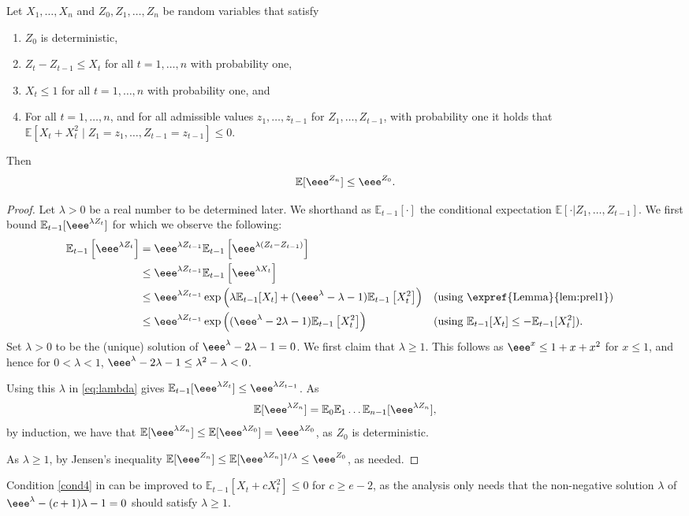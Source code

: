 \documentclass{toc}
\newcommand\E{\mathbb{E}}
\begin{document}
\begin{lemma}
\label{lem:prel2}
Let $X_1,\ldots,X_n$ and $Z_0,Z_1,\ldots,Z_n$ be random variables that satisfy
\begin{enumerate}
\item $Z_0$ is deterministic,
\item $Z_{t}-Z_{t-1}\le X_t$ for all $t=1,\ldots,n$ with probability one,
\item $X_t\leq 1$ for all $t=1,\ldots,n$ with probability one, and
\item \label{cond4} For all $t=1,\ldots,n$, and for all admissible values $z_1,\ldots,z_{t-1}$ for $Z_1,\ldots,Z_{t-1}$,
 with probability one it holds that $\E[X_t+X_t^2\mid Z_1=z_1,\ldots,Z_{t-1}=z_{t-1}] \le 0$.
\end{enumerate}
Then
\[
\E[\eee^{Z_n}] \leq \eee^{ Z_0}.
\]
\end{lemma}
\begin{proof}
Let $\lambda>0$ be a real number to be determined later. We shorthand as $\E_{t-1}[\cdot]$ the conditional expectation $\E[\cdot | Z_1,\dots, Z_{t-1}]$.
We first bound $\E_{t-1}[\eee^{\lambda Z_t}]$ for which we observe the following:
\begin{align}
\E_{t-1}\left[\eee^{\lambda Z_t}\right] &=  \eee^{\lambda Z_{t-1}}\E_{t-1}\left[\eee^{\lambda(Z_t-Z_{t-1})}\right] \nonumber \\
&\le  \eee^{\lambda Z_{t-1}}\E_{t-1}\left[\eee^{\lambda X_t}\right] \nonumber \\
& \le   \eee^{\lambda Z_{t-1}} \exp\left(\lambda \E_{t-1}[X_t] +(\eee^{ \lambda} -\lambda-1 )\E_{t-1}\left[X_t^2\right]\right) && \textrm{(using \expref{Lemma}{lem:prel1})}  \nonumber \\
& \le  \eee^{\lambda Z_{t-1}}\exp\left((\eee^{ \lambda} -2\lambda-1 )\E_{t-1}\left[X_t^2\right]\right) && \textrm{(using }\E_{t-1}[X_t] \le -\E_{t-1}[X_{t}^2] ).
\label{eq:lambda}
\end{align}
Set $\lambda>0$ to be the (unique) solution of $\eee^{ \lambda} -2\lambda-1 =0$.
We first claim that $ \lambda \geq 1$. This follows as  $\eee^x \leq 1 + x + x^2$ for $x \leq 1$, and hence for $0<\lambda<1$,
$\eee^{\lambda} -2\lambda-1 \le\lambda^2 -\lambda <0$.

Using this $\lambda$ in \eqref{eq:lambda} gives
 $\E_{t-1}[\eee^{\lambda Z_t}] \le \eee^{\lambda Z_{t-1}}$.
As
\[ \E[\eee^{\lambda Z_n}] = \E_0 \E_1 \ldots  \E_{n-1} [\eee^{\lambda Z_n}],\]
by induction, we have that $\E[\eee^{\lambda Z_n}] \le \E[\eee^{\lambda Z_0}] = \eee^{\lambda Z_0}$, as
$Z_0$ is deterministic.

As $\lambda \geq 1$, by Jensen's inequality
$\E[\eee^{ Z_n}] \leq \E[\eee^{\lambda Z_n}]^{1/\lambda} \leq \eee^{ Z_0}$,
as needed.
\end{proof}
\begin{remark} Condition \eqref{cond4} in  can be improved to $\E_{t-1}[X_t + c X_t^2] \leq 0$ for $c \geq e-2$, as the analysis only needs that the non-negative solution $\lambda$ of $\eee^{\lambda} -(c+1) \lambda -1=0$ should satisfy $\lambda \geq 1$.
\end{remark}
\end{document}
